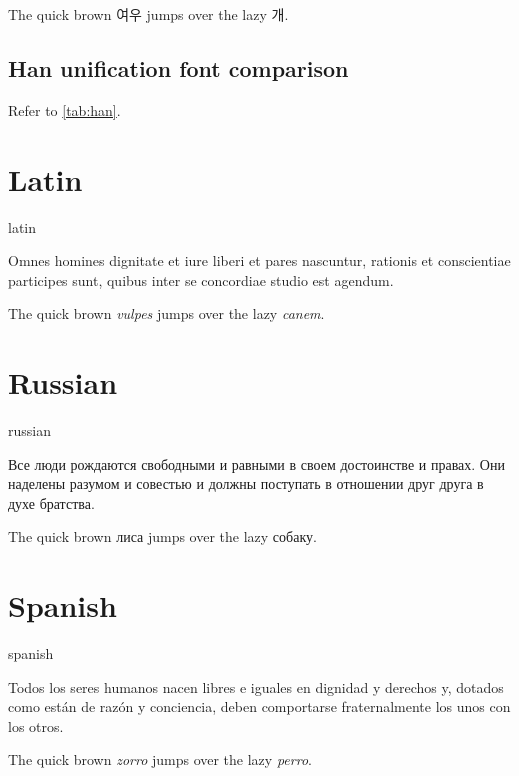 \documentclass[11pt, a4paper]{article}
\begin{document}
		The quick brown \foreignlanguage{korean}{여우} jumps over the lazy \foreignlanguage{korean}{개}.

		\subsection{Han unification font comparison}

			Refer to \autoref{tab:han}.

	\section{Latin}

		\begin{selectlanguage}{latin}
			\begin{displayquote}
				Omnes homines dignitate et iure liberi et pares nascuntur, rationis et conscientiae participes sunt, quibus inter se concordiae studio est agendum.
			\end{displayquote}
		\end{selectlanguage}

		The quick brown \textit{\foreignlanguage{latin}{vulpes}} jumps over the lazy \textit{\foreignlanguage{latin}{canem}}.

	\section{Russian}

		\begin{selectlanguage}{russian}
			\begin{displayquote}
				Все люди рождаются свободными и равными в своем достоинстве и правах. Они наделены разумом и совестью и должны поступать в отношении друг друга в духе братства.
			\end{displayquote}
		\end{selectlanguage}

		The quick brown \foreignlanguage{russian}{лиса} jumps over the lazy \foreignlanguage{russian}{собаку}.

	\section{Spanish}

		\begin{selectlanguage}{spanish}
			\begin{displayquote}
				Todos los seres humanos nacen libres e iguales en dignidad y derechos y, dotados como están de razón y conciencia, deben comportarse fraternalmente los unos con los otros.
			\end{displayquote}
		\end{selectlanguage}

		The quick brown \textit{\foreignlanguage{spanish}{zorro}} jumps over the lazy \textit{\foreignlanguage{spanish}{perro}}.
\end{document}
